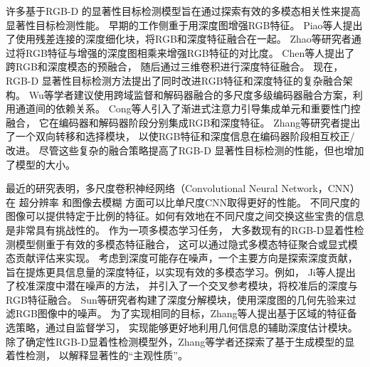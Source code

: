 许多基于RGB-D 的显著性目标检测模型旨在通过探索有效的多模态相关性来提高显著性目标检测性能。
早期的工作侧重于用深度图增强RGB特征。
Piao等人提出了使用残差连接的深度细化块，将RGB和深度特征融合在一起。
Zhao等研究者通过将RGB特征与增强的深度图相乘来增强RGB特征的对比度。
Chen等人提出了跨RGB和深度模态的预融合，
随后通过三维卷积进行深度特征融合。
现在，RGB-D 显著性目标检测方法提出了同时改进RGB特征和深度特征的复杂融合架构。
Wu等学者建议使用跨域监督和解码器融合的多尺度多级编码器融合方案，利用通道间的依赖关系。
Cong等人引入了渐进式注意力引导集成单元和重要性门控融合，
它在编码器和解码器阶段分别集成RGB和深度特征。
Zhang等研究者提出了一个双向转移和选择模块，
以使RGB特征和深度信息在编码器阶段相互校正/改进。
尽管这些复杂的融合策略提高了RGB-D 显著性目标检测的性能，但也增加了模型的大小。








最近的研究表明，多尺度卷积神经网络（Convolutional Neural Network，CNN）在
超分辨率
和图像去模糊
方面可以比单尺度CNN取得更好的性能。
不同尺度的图像可以提供特定于比例的特征。如何有效地在不同尺度之间交换这些宝贵的信息是非常具有挑战性的。
作为一项多模态学习任务，
大多数现有的RGB-D显着性检测模型侧重于有效的多模态特征融合，
这可以通过隐式多模态特征聚合或显式模态贡献评估来实现。
考虑到深度可能存在噪声，一个主要方向是探索深度贡献，
旨在提炼更具信息量的深度特征，以实现有效的多模态学习。例如，
Ji等人提出了校准深度中潜在噪声的方法，
并引入了一个交叉参考模块，将校准后的深度与RGB特征融合。
Sun等研究者构建了深度分解模块，使用深度图的几何先验来过滤RGB图像中的噪声。
为了实现相同的目标，Zhang等人提出基于区域的特征备选策略，通过自监督学习，
实现能够更好地利用几何信息的辅助深度估计模块。
除了确定性RGB-D显着性检测模型外，Zhang等学者还探索了基于生成模型的显着性检测，
以解释显著性的“主观性质”。



